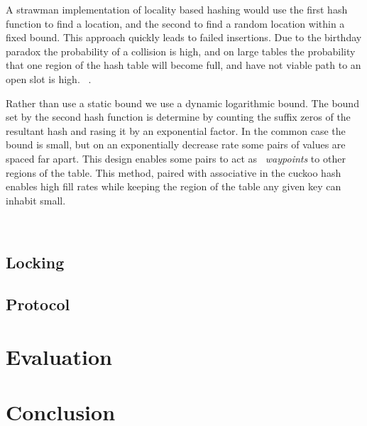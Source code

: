 A strawman implementation of locality based hashing would
use the first hash function to find a location, and the
second to find a random location within a fixed bound. This
approach quickly leads to failed insertions. Due to the
birthday paradox the probability of a collision is high, and
on large tables the probability that one region of the hash
table will become full, and have not viable path to an open
slot is high. ~.

Rather than use a static bound we use a dynamic logarithmic
bound. The bound set by the second hash function is
determine by counting the suffix zeros of the resultant hash
and rasing it by an exponential factor. In the common case
the bound is small, but on an exponentially decrease rate
some pairs of values are spaced far apart. This design
enables some pairs to act as ~\textit{waypoints} to other
regions of the table. This method, paired with associative
in the cuckoo hash enables high fill rates while keeping the
region of the table any given key can inhabit
small.~

~

\subsection{Locking}

\subsection{Protocol}


\section{Evaluation}
\label{sec:eval}

\section{Conclusion}
\label{sec:conclusion}
